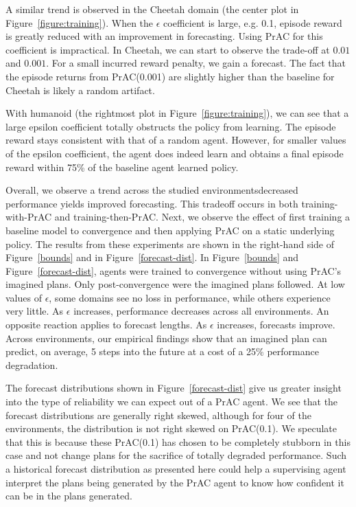\documentclass[letterpaper]{article} %
\begin{document}
            A similar trend is observed in the Cheetah domain (the center plot in Figure~\ref{figure:training}). When the $\epsilon$ coefficient is large, e.g. 0.1, episode reward is greatly reduced with an improvement in forecasting. Using PrAC for this coefficient is impractical. In Cheetah, we can start to observe the trade-off at $0.01$ and $0.001$. For a small incurred reward penalty, we gain a forecast. The fact that the episode returns from PrAC(0.001) are slightly higher than the baseline for Cheetah is likely a random artifact.

            With humanoid (the rightmost plot in Figure~\ref{figure:training}), we can see that a large epsilon coefficient totally obstructs the policy from learning. The episode reward stays consistent with that of a random agent. However, for smaller values of the epsilon coefficient, the agent does indeed learn and obtains a final episode reward within 75\% of the baseline agent learned policy. 

            Overall, we observe a trend across the studied environments\textemdash decreased performance yields improved forecasting. This tradeoff occurs in both training-with-PrAC and training-then-PrAC. Next, we observe the effect of first training a baseline model to convergence and then applying PrAC on a static underlying policy. The results from these experiments are shown in the right-hand side of Figure~\ref{bounds} and in Figure~\ref{forecast-dist}. In Figure~\ref{bounds} and Figure~\ref{forecast-dist}, agents were trained to convergence without using PrAC's imagined plans. Only post-convergence were the imagined plans followed. At low values of $\epsilon$, some domains see no loss in performance, while others experience very little. As $\epsilon$ increases, performance decreases across all environments. An opposite reaction applies to forecast lengths. As $\epsilon$ increases, forecasts improve. Across environments, our empirical findings show that an imagined plan can predict, on average, 5 steps into the future at a cost of a 25\% performance degradation.

            The forecast distributions shown in Figure~\ref{forecast-dist} give us greater insight into the type of reliability we can expect out of a PrAC agent. We see that the forecast distributions are generally right skewed, although for four of the environments, the distribution is not right skewed on PrAC(0.1). We speculate that this is because these PrAC(0.1) has chosen to be completely stubborn in this case and not change plans for the sacrifice of totally degraded performance. Such a historical forecast distribution as presented here could help a supervising agent interpret the plans being generated by the PrAC agent to know how confident it can be in the plans generated.
\end{document}
